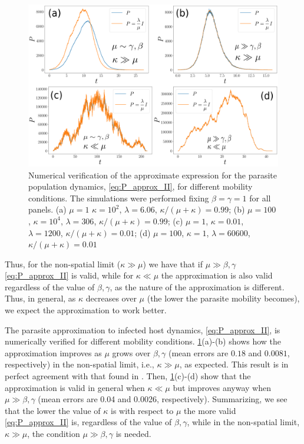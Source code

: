 \begin{figure}[H]
    \centering
    \includegraphics[width=\columnwidth]{Figures/P_approx.png}
    \caption[Validation of the approximate expression for the parasite
        population dynamics]{Numerical verification of the approximate
        expression for the parasite population dynamics, \cref{eq:P_approx_II},
        for different mobility conditions. The simulations were performed
        fixing $\beta=\gamma=1$ for all panels. (a) $\mu=1$ $\kappa=10^2$,
        $\lambda=6.06$, $\kappa/(\mu+\kappa)=0.99$;
        (b) $\mu=100$, $\kappa=10^4$, $\lambda=306$,
        $\kappa/(\mu+\kappa)=0.99$; (c)
        $\mu=1$, $\kappa=0.01$, $\lambda=1200$, $\kappa/(\mu+\kappa)=0.01$; (d)
        $\mu=100$, $\kappa=1$, $\lambda=60600$,  $\kappa/(\mu+\kappa)=0.01$}
    \label{fig:P_approx}
\end{figure}

Thus, for the non-spatial limit ($\kappa\gg\mu$) we have that if
$\mu\gg\beta,\gamma$ \cref{eq:P_approx_II} is valid, while for $\kappa\ll\mu$
the
approximation is also valid regardless of the value of $\beta,\gamma$, as the
nature of the approximation is different. Thus, in general, as $\kappa$
decreases over $\mu$ (the lower the parasite mobility becomes), we expect the
approximation to work better.

The parasite approximation to infected host dynamics, \cref{eq:P_approx_II},
is numerically verified for different mobility conditions.
\cref{fig:P_approx}(a)-(b) shows how the approximation improves as $\mu$ grows
over $\beta,\gamma$ (mean errors are $0.18$ and $0.0081$, respectively) in the
non-spatial limit, i.e., $\kappa\gg\mu$, as expected. This result is in perfect
agreement with that found in \cite{GimenezRomero2021}. Then,
\cref{fig:P_approx}(c)-(d) show that the approximation is valid in general when
$\kappa\ll\mu$ but improves anyway when $\mu\gg\beta,\gamma$ (mean errors are
0.04 and 0.0026, respectively). Summarizing, we see that the lower the value of
$\kappa$ is with respect to $\mu$ the more valid \cref{eq:P_approx_II} is,
regardless of the value of $\beta,\gamma$, while in the non-spatial limit,
$\kappa\gg\mu$, the condition $\mu\gg\beta,\gamma$ is needed.

